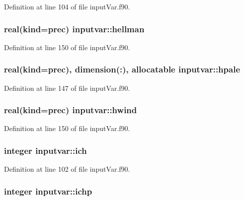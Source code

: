 Definition at line 104 of file input\-Var.\-f90.

\hypertarget{classinputvar_ad9ba538cb5982defe216a14bc80bf73e}{
\subsubsection[{hellman}]{\setlength{\rightskip}{0pt plus 5cm}real(kind=prec) inputvar\-::hellman}}\label{classinputvar_ad9ba538cb5982defe216a14bc80bf73e}


Definition at line 150 of file input\-Var.\-f90.

\hypertarget{classinputvar_a1a0e84530e6db6a46aabfcea51b086bf}{
\subsubsection[{hpale}]{\setlength{\rightskip}{0pt plus 5cm}real(kind=prec), dimension(\-:), allocatable inputvar\-::hpale}}\label{classinputvar_a1a0e84530e6db6a46aabfcea51b086bf}


Definition at line 147 of file input\-Var.\-f90.

\hypertarget{classinputvar_aef589b7d9f863ca157c6d7921781fe58}{
\subsubsection[{hwind}]{\setlength{\rightskip}{0pt plus 5cm}real(kind=prec) inputvar\-::hwind}}\label{classinputvar_aef589b7d9f863ca157c6d7921781fe58}


Definition at line 150 of file input\-Var.\-f90.

\hypertarget{classinputvar_a69cdcc78492d1a96e3f02ee2915f207d}{
\subsubsection[{ich}]{\setlength{\rightskip}{0pt plus 5cm}integer inputvar\-::ich}}\label{classinputvar_a69cdcc78492d1a96e3f02ee2915f207d}


Definition at line 102 of file input\-Var.\-f90.

\hypertarget{classinputvar_af57151a30c510558682b98e1b72d844b}{
\subsubsection[{ichp}]{\setlength{\rightskip}{0pt plus 5cm}integer inputvar\-::ichp}}\label{classinputvar_af57151a30c510558682b98e1b72d844b}


